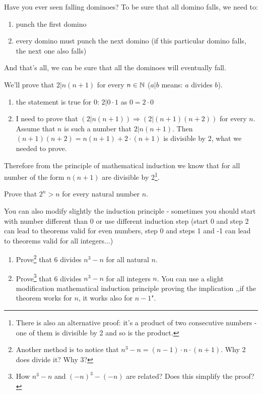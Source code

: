 Have you ever seen falling dominoes? To be sure that all domino falls, we need to:
\begin{enumerate}
	\item punch the first domino
	\item every domino must punch the next domino (if this particular domino falls, the next one also falls)
\end{enumerate}
And that's all, we can be sure that all the dominoes will eventually fall.

\begin{example}
  We'll prove that $2| n(n+1)$ for every $n\in \mathbb N$ ($a|b$ means: $a$ divides $b$).
  \begin{enumerate}
    \item the statement is true for $0$: $2 | 0\cdot 1$ as $0=2\cdot 0$
    \item I need to prove that $(2|n(n+1))\Rightarrow (2|(n+1)(n+2))$ for every $n$. Assume that $n$ is such a number that $2|n(n+1)$.
    Then $(n+1)(n+2)=n(n+1) + 2\cdot (n+1)$ is divisible by 2, what we needed to prove.
  \end{enumerate}
  Therefore from the principle of mathematical induction we know that for all number of the form $n(n+1)$ are divisible by 2\footnote{There is also an alternative proof: it's
  a product of two consecutive numbers - one of them is divisible by 2 and so is the product.}.
\end{example}

\begin{exercise}
	Prove that $2^n>n$ for every natural number $n$.
\end{exercise}

\noindent You can also modify slightly the induction principle - sometimes you should start with number different than 0 or use different induction step
(start 0 and step 2 can lead to theorems valid for even numbers, step 0 and steps 1 and -1 can lead to theorems valid for all integers...)
\begin{exercise}
    \begin{enumerate}
	   \item Prove\footnote{Another method is to notice that $n^3-n=(n-1)\cdot n\cdot (n+1)$. Why 2 does divide it? Why 3?} that 6 divides
		     $n^3-n$ for all natural $n$.
	    \item Prove\footnote{How $n^3-n$ and $(-n)^3-(-n)$ are related? Does this simplify the proof?} that 6 divides $n^3-n$ for all integers $n$.
		      You can use a slight modification mathematical induction principle proving the implication
		      ,,if the theorem works for $n$, it works also for $n-1$".
    \end{enumerate}
\end{exercise}

